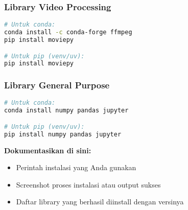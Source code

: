 \documentclass[11pt,a4paper]{article}
\begin{document}
\subsubsection{Library Video Processing}
\begin{lstlisting}[language=bash, caption=Instalasi library video]
# Untuk conda:
conda install -c conda-forge ffmpeg
pip install moviepy

# Untuk pip (venv/uv):
pip install moviepy
\end{lstlisting}

\subsubsection{Library General Purpose}
\begin{lstlisting}[language=bash, caption=Instalasi library umum]
# Untuk conda:
conda install numpy pandas jupyter

# Untuk pip (venv/uv):
pip install numpy pandas jupyter
\end{lstlisting}

\textbf{Dokumentasikan di sini:}
\begin{itemize}
    \item Perintah instalasi yang Anda gunakan
    \item Screenshot proses instalasi atau output sukses
    \item Daftar library yang berhasil diinstall dengan versinya
\end{itemize}
\end{document}
